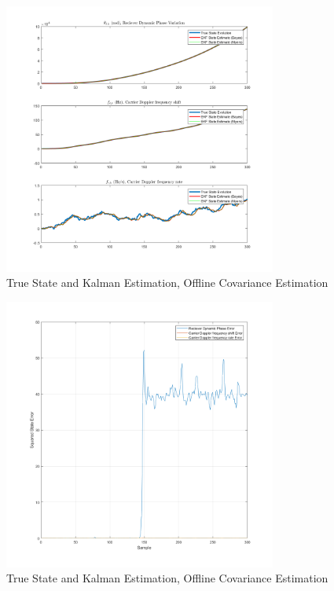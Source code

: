 \documentclass[11pt]{article}
\begin{document}
\begin{figure}[ht]
    \centering
    \includegraphics[width=0.8\textwidth]{Final Project/figures/off1.png}
    \caption{True State and Kalman Estimation, Offline Covariance Estimation}
    \label{fig:off1}
\end{figure}

\begin{figure}[ht]
    \centering
    \includegraphics[width=0.8\textwidth]{Final Project/figures/off2.png}
    \caption{True State and Kalman Estimation, Offline Covariance Estimation}
    \label{fig:off2}
\end{figure}
\end{document}
